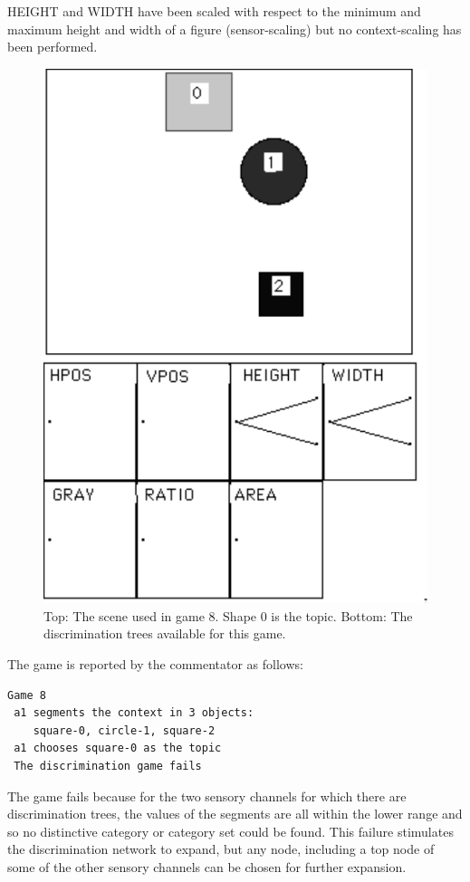 HEIGHT and WIDTH have been scaled with respect to the 
minimum and maximum height and width of a 
figure (sensor-scaling) but no context-scaling has 
been performed. 
\begin{figure}[htbp]
  \centerline{\includegraphics[width=.40\textwidth]{chap4/figs/scene8}}
\caption{\label{scene2} Top: The scene used in game 8. 
Shape 0 is the topic. Bottom: The discrimination trees available
for this game.}
\end{figure}
The game is reported by the commentator as follows: 
\begin{verbatim}
Game 8
 a1 segments the context in 3 objects: 
    square-0, circle-1, square-2
 a1 chooses square-0 as the topic
 The discrimination game fails
\end{verbatim}
The game fails because for the two sensory channels 
for which there are discrimination trees, the values 
of the segments are all within the lower range and so 
no distinctive category or category set could be found. 
This failure stimulates
the discrimination network to expand, but any node, 
including a top node of some of the other sensory channels 
can be chosen for further expansion. 


